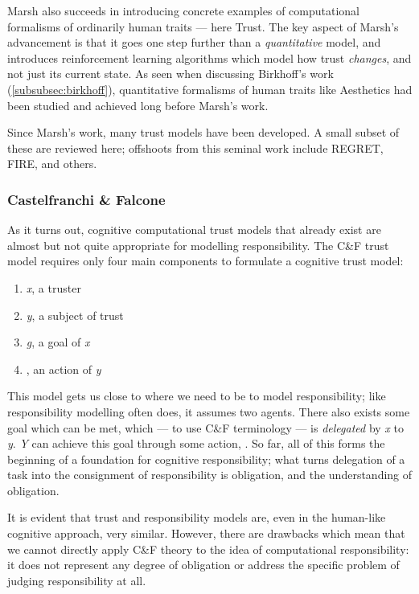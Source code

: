 Marsh also succeeds in introducing concrete examples of computational formalisms of ordinarily human traits --- here Trust. The key aspect of Marsh's advancement is that it goes one step further than a \emph{quantitative} model, and introduces reinforcement learning algorithms which model how trust \emph{changes}, and not just its current state. As seen when discussing Birkhoff's work (\cref{subsubsec:birkhoff}), quantitative formalisms of human traits like Aesthetics had been studied and achieved long before Marsh's work.\par

Since Marsh's work, many trust models have been developed. A small subset of these are reviewed here; offshoots from this seminal work include REGRET, FIRE, and others.\par

\subsubsection{Castelfranchi \& Falcone}
As it turns out, cognitive computational trust models that already exist are almost but not quite appropriate for modelling responsibility. The C\&F trust model requires only four main components to formulate a cognitive trust model:

\begin{enumerate}
    \item \emph{x}, a truster
    \item \emph{y}, a subject of trust
    \item \emph{g}, a goal of \emph{x}
    \item \emph{\safealpha}, an action of \emph{y}
\end{enumerate}\par

This model gets us close to where we need to be to model responsibility; like responsibility modelling often does, it assumes two agents. There also exists some goal which can be met, which --- to use C\&F terminology --- is \emph{delegated} by \emph{x} to \emph{y}. \emph{Y} can achieve this goal through some action, \emph{\safealpha}. So far, all of this forms the beginning of a foundation for cognitive responsibility; what turns delegation of a task into the consignment of responsibility is obligation, and the understanding of obligation. \par

It is evident that trust and responsibility models are, even in the human-like cognitive approach, very similar. However, there are drawbacks which mean that we cannot directly apply C\&F theory to the idea of computational responsibility: it does not represent any degree of obligation or address the specific problem of judging responsibility at all.\par

